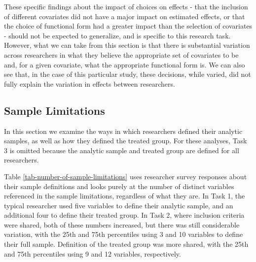\documentclass[
  letterpaper,
  DIV=11,
  numbers=noendperiod]{scrartcl}
\begin{document}
These specific findings about the impact of choices on effects - that
the inclusion of different covariates did not have a major impact on
estimated effects, or that the choice of functional form had a greater
impact than the selection of covariates - should not be expected to
generalize, and is specific to this research task. However, what we can
take from this section is that there is substantial variation across
researchers in what they believe the appropriate set of covariates to be
and, for a given covariate, what the appropriate functional form is. We
can also see that, in the case of this particular study, these
decisions, while varied, did not fully explain the variation in effects
between researchers.

\hypertarget{sec-sample-limitations}{%
\subsection{Sample Limitations}\label{sec-sample-limitations}}

In this section we examine the ways in which researchers defined their
analytic samples, as well as how they defined the treated group. For
these analyses, Task 3 is omitted because the analytic sample and
treated group are defined for all researchers.

Table \ref{tab-number-of-sample-limitations} uses researcher survey
responses about their sample definitions and looks purely at the number
of distinct variables referenced in the sample limitations, regardless
of what they are. In Task 1, the typical researcher used five variables
to define their analytic sample, and an additional four to define their
treated group. In Task 2, where inclusion criteria were shared, both of
these numbers increased, but there was still considerable variation,
with the 25th and 75th percentiles using 3 and 10 variables to define
their full sample. Definition of the treated group was more shared, with
the 25th and 75th percentiles using 9 and 12 variables, respectively.
\end{document}
